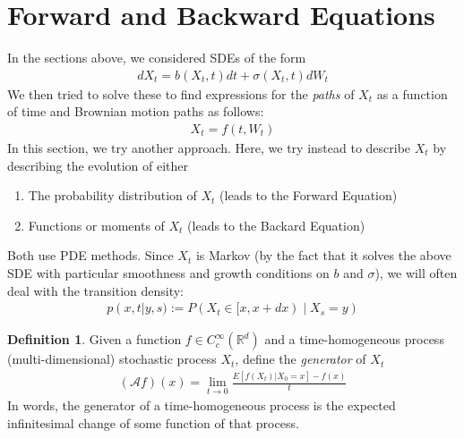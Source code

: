 \documentclass[12pt]{article}
\theoremstyle{plain}
\theoremstyle{definition}
\newtheorem{defn}[thm]{Definition}
\theoremstyle{remark}
\begin{document}
\section{Forward and Backward Equations}

In the sections above, we considered SDEs of the form
\begin{align*}
  dX_t = b(X_t,t) dt + \sigma(X_t,t) dW_t
\end{align*}
We then tried to solve these to find expressions for the \emph{paths} of $X_t$ as a function of time and Brownian motion paths as follows:
\begin{align*}
  X_t = f(t,W_t)
\end{align*}
In this section, we try another approach. Here, we try instead to
describe $X_t$ by describing the evolution of either
\begin{enumerate}
  \item The probability distribution of $X_t$ (leads to the Forward
    Equation)
  \item Functions or moments of $X_t$ (leads to the Backard Equation)
\end{enumerate}
Both use PDE methods. Since $X_t$ is Markov (by the fact that it solves
the above SDE with particular smoothness and growth conditions on $b$
and $\sigma$), we will often deal with the transition density:
\begin{align*}
  p(x,t|y,s) := P(X_t\in [x,x+dx) \; | \; X_s=y)
\end{align*}

\begin{defn}
Given a function $f\in C_c^\infty(\mathbb{R}^d)$ and a time-homogeneous
process (multi-dimensional) stochastic process $X_t$, define the
\emph{generator} of $X_t$
\begin{align}
  (\mathscr{A}f)(x)=
  \lim_{t\rightarrow0} \frac{E[f(X_t)|X_0=x]-f(x)}{t}
  \label{genA}
\end{align}
In words, the generator of a time-homogeneous process is the
expected infinitesimal change of some function of that process.
\end{defn}
\end{document}
